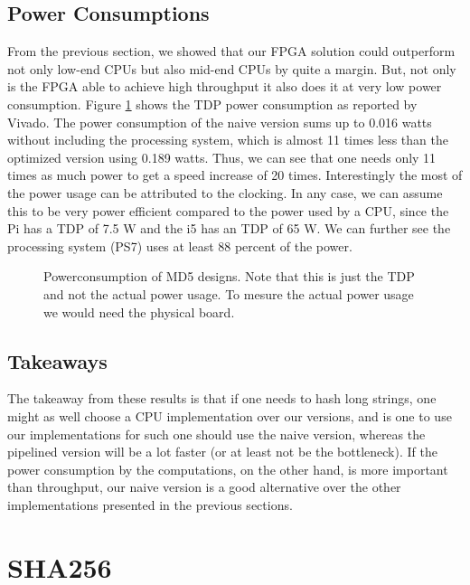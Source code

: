 \documentclass[a4paper, openany]{book}
\begin{document}
\subsection{Power Consumptions}
\label{sec:orgbec0923}
\label{sec:md5power}
From the previous section, we showed that our FPGA solution could outperform not only low-end CPUs but also mid-end CPUs by quite a margin. But, not only is the FPGA able to achieve high throughput it also does it at very low power consumption. Figure \ref{fig:md5_naive_power} shows the TDP power consumption as reported by Vivado. The power consumption of the naive version sums up to 0.016 watts without including the processing system, which is almost 11 times less than the optimized version using 0.189 watts. Thus, we can see that one needs only 11 times as much power to get a speed increase of 20 times. Interestingly the most of the power usage can be attributed to the clocking.
In any case, we can assume this to be very power efficient compared to the power used by a CPU, since the Pi has a TDP of 7.5 W and the i5 has an TDP of 65 W. We can further see the processing system (PS7) uses at least 88 percent of the power.
\begin{figure}[H]
\centering
{}
\caption[Power consumption of MD5 designs]%
{Powerconsumption of MD5 designs. Note that this is just the TDP and not the actual power usage. To mesure the actual power usage we would need the physical board.}
\label{fig:md5_naive_power}
\end{figure}
\subsection{Takeaways}
\label{sec:org153861b}
The takeaway from these results is that if one needs to hash long strings, one might as well choose a CPU implementation over our versions, and is one to use our implementations for such one should use the naive version, whereas the pipelined version will be a lot faster (or at least not be the bottleneck). If the power consumption by the computations, on the other hand, is more important than throughput, our naive version is a good alternative over the other implementations presented in the previous sections.
\section{SHA256}
\label{sec:orgad8f9e5}
\label{sec:SHAperformance}
\end{document}
